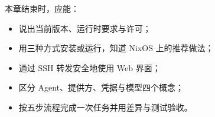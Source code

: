\begin{checkpoint}
本章结束时，应能：
\begin{itemize}
  \item 说出当前版本、运行时要求与许可；
  \item 用三种方式安装或运行，知道 NixOS 上的推荐做法；
  \item 通过 SSH 转发安全地使用 Web 界面；
  \item 区分 Agent、提供方、凭据与模型四个概念；
  \item 按五步流程完成一次任务并用差异与测试验收。
\end{itemize}
\end{checkpoint}

